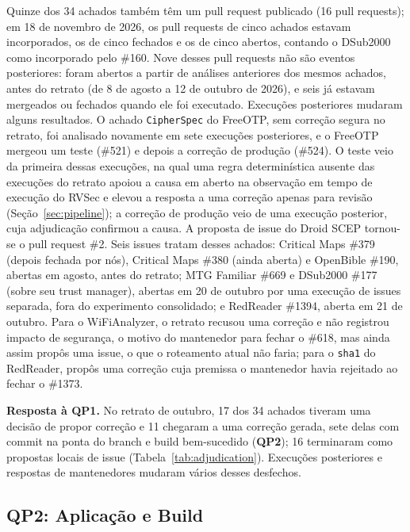\documentclass[conference]{IEEEtran}
\newcommand{\researchq}[1]{\textbf{QP#1}}
\begin{document}
Quinze dos 34 achados também têm um pull request publicado (16 pull requests); em 18 de novembro de 2026, os pull requests de cinco
achados estavam incorporados, os de cinco fechados e os de cinco abertos,
contando o DSub2000 como incorporado pelo \#160. Nove desses pull requests não
são eventos posteriores: foram abertos a partir de análises anteriores dos
mesmos achados, antes do retrato (de 8 de agosto a 12 de outubro de 2026), e
seis já estavam mergeados ou fechados quando ele foi executado. Execuções
posteriores mudaram alguns resultados. O achado \texttt{CipherSpec} do FreeOTP,
sem correção segura no retrato, foi analisado novamente em sete execuções
posteriores, e o FreeOTP mergeou um teste (\#521) e depois a correção de
produção (\#524). O teste veio da primeira dessas execuções, na qual uma regra determinística
ausente das execuções do retrato apoiou a causa em aberto na observação em tempo
de execução do RVSec e elevou a resposta a uma correção apenas para revisão
(Seção~\ref{sec:pipeline}); a correção de produção veio de uma execução
posterior, cuja adjudicação confirmou a causa. A proposta de issue do Droid SCEP tornou-se o pull request \#2. Seis issues
tratam desses achados: Critical Maps \#379 (depois fechada por nós), Critical Maps \#380
(ainda aberta) e OpenBible \#190, abertas em agosto, antes do retrato; MTG
Familiar \#669 e DSub2000 \#177 (sobre seu trust manager), abertas em 20 de
outubro por uma execução de issues separada, fora do experimento consolidado; e
RedReader \#1394, aberta em 21 de outubro.
Para o WiFiAnalyzer, o retrato recusou uma correção e não registrou impacto de segurança,
o motivo do mantenedor para fechar o \#618, mas ainda assim propôs uma issue, o que
o roteamento atual não faria; para o \texttt{sha1} do RedReader, propôs uma correção
cuja premissa o mantenedor havia rejeitado ao fechar o \#1373.

\textbf{Resposta à \researchq{1}.} No retrato de outubro, 17 dos 34 achados
tiveram uma decisão de propor correção e 11 chegaram a uma correção gerada, sete
delas com commit na ponta do branch e build bem-sucedido (\researchq{2}); 16
terminaram como propostas locais de issue (Tabela~\ref{tab:adjudication}). Execuções
posteriores e respostas de mantenedores mudaram vários desses desfechos.

\subsection{\researchq{2}: Aplicação e Build}
\label{subsec:rq2}
\end{document}
